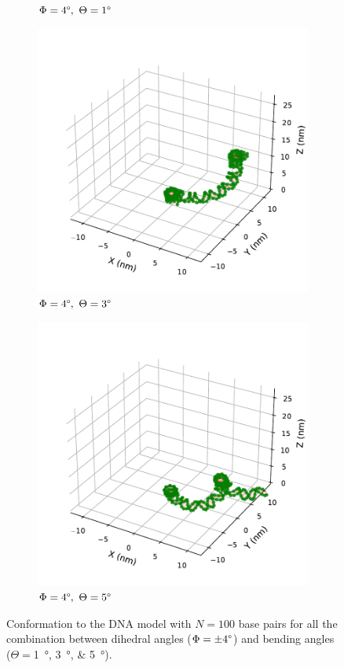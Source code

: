 \documentclass[a4paper,10pt]{article}
\begin{document}
\begin{figure}[htbp]
\begin{subfigure}{0.3\textwidth}
\caption{$\Phi=4\degree,\ \Theta=1\degree$}
\label{fig:bend_d}
\end{subfigure}
\begin{subfigure}{0.3\textwidth}
\includegraphics[width=\textwidth]{bw_4_3.pdf}
\caption{$\Phi=4\degree,\ \Theta=3\degree$}
\label{fig:bend_e}
\end{subfigure}
\begin{subfigure}{0.3\textwidth}
\includegraphics[width=\textwidth]{bw_4_5.pdf}
\caption{$\Phi=4\degree,\ \Theta=5\degree$}
\label{fig:bend_f}
\end{subfigure}
\caption{Conformation to the DNA model with $N=100$ base pairs for all the combination between dihedral angles ($\Phi=\pm 4\degree$) and bending angles ($\Theta=$\SIlist{1;3;5}{\degree}).}
\label{fig:bend}
\end{figure}
\end{document}
